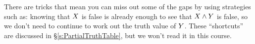 %
%
%
%
%
%
%

There are tricks that mean you can miss out some of the gaps by using strategies such as: knowing that $X$ is false is already enough to see that $X\mathbin{\wedge}Y$ is false, so we don't need to continue to work out the truth value of $Y$. These ``shortcuts'' are discussed in \S\ref{s:PartialTruthTable}, but we won't read it in this course.

